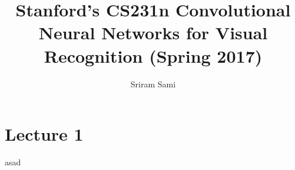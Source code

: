 \documentclass[12pt,a4paper]{article}
\author{Sriram Sami}
\title{Stanford's CS231n Convolutional Neural Networks for Visual Recognition (Spring 2017)}
\begin{document}
\maketitle
\tableofcontents
\newpage

\section{Lecture 1}

asad
\end{document}

